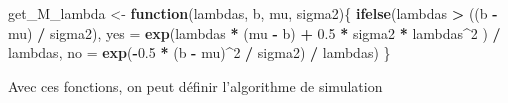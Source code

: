 \documentclass[]{article}
\newenvironment{Shaded}{\begin{snugshade}}{\end{snugshade}}
\newcommand{\ControlFlowTok}[1]{\textcolor[rgb]{0.13,0.29,0.53}{\textbf{#1}}}
\newcommand{\DataTypeTok}[1]{\textcolor[rgb]{0.13,0.29,0.53}{#1}}
\newcommand{\DecValTok}[1]{\textcolor[rgb]{0.00,0.00,0.81}{#1}}
\newcommand{\FloatTok}[1]{\textcolor[rgb]{0.00,0.00,0.81}{#1}}
\newcommand{\KeywordTok}[1]{\textcolor[rgb]{0.13,0.29,0.53}{\textbf{#1}}}
\newcommand{\NormalTok}[1]{#1}
\newcommand{\OperatorTok}[1]{\textcolor[rgb]{0.81,0.36,0.00}{\textbf{#1}}}
\newcommand{\StringTok}[1]{\textcolor[rgb]{0.31,0.60,0.02}{#1}}
\newenvironment{Correction}%
  { \vspace{\baselineskip}\begin{mdframed}[backgroundcolor=my_green]}%
  {\end{mdframed}}
\begin{document}
\begin{Shaded}
\begin{Highlighting}[]
\NormalTok{get_M_lambda <-}\StringTok{ }\ControlFlowTok{function}\NormalTok{(lambdas, b, mu, sigma2)\{}
  \KeywordTok{ifelse}\NormalTok{(lambdas }\OperatorTok{>}\StringTok{ }\NormalTok{((b }\OperatorTok{-}\StringTok{ }\NormalTok{mu) }\OperatorTok{/}\StringTok{ }\NormalTok{sigma2),}
         \DataTypeTok{yes =} \KeywordTok{exp}\NormalTok{(lambdas }\OperatorTok{*}\StringTok{ }\NormalTok{(mu }\OperatorTok{-}\StringTok{ }\NormalTok{b) }\OperatorTok{+}\StringTok{ }\FloatTok{0.5} \OperatorTok{*}\StringTok{ }\NormalTok{sigma2 }\OperatorTok{*}\StringTok{ }\NormalTok{lambdas}\OperatorTok{^}\DecValTok{2}\NormalTok{ ) }\OperatorTok{/}\StringTok{ }\NormalTok{lambdas,}
         \DataTypeTok{no =} \KeywordTok{exp}\NormalTok{(}\OperatorTok{-}\FloatTok{0.5} \OperatorTok{*}\StringTok{ }\NormalTok{(b }\OperatorTok{-}\StringTok{ }\NormalTok{mu)}\OperatorTok{^}\DecValTok{2} \OperatorTok{/}\StringTok{ }\NormalTok{sigma2) }\OperatorTok{/}\StringTok{ }\NormalTok{lambdas)}
\NormalTok{\}}
\end{Highlighting}
\end{Shaded}

\begin{Correction}
Avec ces fonctions, on peut définir l'algorithme de simulation
\end{Correction}
\end{document}
